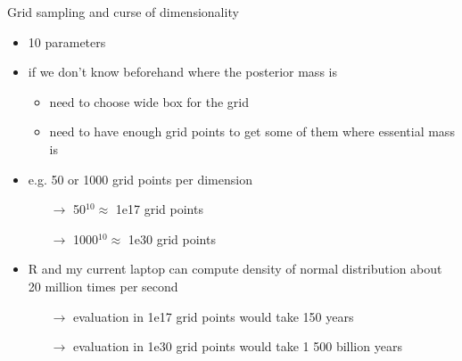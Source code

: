 \documentclass[finnish,english,t]{beamer}
\begin{document}
\begin{frame}
  
  {\Large\color{navyblue} Grid sampling and curse of dimensionality}

  \begin{itemize}
      \item 10 parameters
      \item if we don't know beforehand where the posterior mass is
        \begin{itemize}
          \item need to choose wide box for the grid
          \item need to have enough grid points to get some of them
            where essential mass is
        \end{itemize}
      \item e.g. 50 or 1000 grid points per dimension
        \begin{itemize}
        \item[$\rightarrow$] 50$^{10} \approx$ 1e17 grid points
        \item[$\rightarrow$] 1000$^{10} \approx$ 1e30 grid points
        \end{itemize}
      \item R and my current laptop can compute density of normal
        distribution about 20 million times per second
        \begin{itemize}
        \item[$\rightarrow$] evaluation in 1e17 grid points would take
           150 years %
        \item[$\rightarrow$] evaluation in 1e30 grid points would take
           1 500 billion years %
        \end{itemize}
 \end{itemize}

\end{frame}
\end{document}

